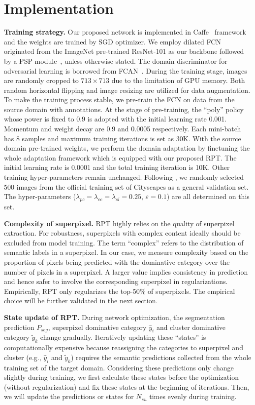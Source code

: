 \documentclass[10pt,twocolumn,letterpaper]{article}
\begin{document}
\section{Implementation} \label{sec:imp}
\textbf{Training strategy.} Our proposed network is implemented in Caffe~\cite{jia2014caffe} framework and the weights are trained by SGD optimizer. We employ dilated FCN~\cite{chen2016deeplab} originated from the ImageNet pre-trained ResNet-101 as our backbone followed by a PSP module~\cite{zhao2017pspnet}, unless otherwise stated. The domain discriminator for adversarial learning is borrowed from FCAN~\cite{Zhang_2018_CVPR}. During the training stage, images are randomly cropped to $713\times713$ due to the limitation of GPU memory. Both random horizontal flipping and image resizing are utilized for data augmentation. To make the training process stable, we pre-train the FCN on data from the source domain with annotations. At the stage of pre-training, the ``poly'' policy whose power is fixed to 0.9 is adopted with the initial learning rate 0.001. Momentum and weight decay are 0.9 and 0.0005 respectively. Each mini-batch has 8 samples and maximum training iterations is set as 30K. With the source domain pre-trained weights, we perform the domain adaptation by finetuning the whole adaptation framework which is equipped with our proposed RPT. The initial learning rate is 0.0001 and the total training iteration is 10K. Other training hyper-parameters remain unchanged.
Following \cite{lian2019constructing}, we randomly selected 500 images from the official training set of Cityscapes as a general validation set. The hyper-parameters ($\lambda_{pc}=\lambda_{cc}=\lambda_{sl}=0.25$, $\varepsilon=0.1$) are all determined on this set.

\textbf{Complexity of superpixel.}
RPT highly relies on the quality of superpixel extraction. For robustness, superpixels with complex content ideally should be excluded from model training. The term ``complex'' refers to the distribution of semantic labels in a superpixel. In our case, we measure complexity based on the proportion of pixels being predicted with the dominative category over the number of pixels in a superpixel. A larger value implies consistency in prediction and hence safer to involve the corresponding superpixel in regularizations. Empirically, RPT only regularizes the top-50\% of superpixels. The empirical choice will be further validated in the next section.

\textbf{State update of RPT.}
During network optimization, the segmentation prediction $P_{seg}$, superpixel dominative category $\hat{y}_i$ and cluster dominative category $\tilde{y}_k$ change gradually. Iteratively updating these ``states'' is computationally expensive because reassigning the categories to superpixel and cluster (e.g., $\hat{y}_i$ and $\tilde{y}_k$) requires the semantic predictions collected from the whole training set of the target domain. Considering these predictions only change slightly during training, we first calculate these states before the optimization (without regularization) and fix these states at the beginning of iterations. Then, we will update the predictions or states for $N_{su}$ times evenly during training.
\end{document}
